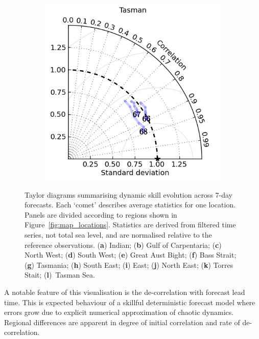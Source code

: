 \begin{figure}[H]
\begin{subfigure}{0.30\textwidth}
        \caption{}
    \end{subfigure}
    \begin{subfigure}{0.30\textwidth}
        \includegraphics[width=\textwidth]{figures/plots/taylor_diag_res_Tasman.png}
        \caption{}
    \end{subfigure}
    \caption{ Taylor diagrams summarising dynamic skill evolution across 7-day forecasts.
    Each `comet' describes average statistics for one location.
    Panels are divided according to regions shown in Figure~\ref{fig:map_locations}.
    Statistics are derived from filtered time series, not total sea level, and are normalised relative to the reference observations. (\textbf{a}) Indian; (\textbf{b}) Gulf of Carpentaria; (\textbf{c}) North West; (\textbf{d}) South West; (\textbf{e}) Great Aust Bight; (\textbf{f}) Bass Strait; (\textbf{g}) Tasmania; (\textbf{h}) South East; (\textbf{i}) East; (\textbf{j}) North East; (\textbf{k}) Torres Stait; (\textbf{l})~Tasman Sea. }\vspace{-12pt}
    \label{fig:taylors}
\end{figure}   
A notable feature of this visualisation is the de-correlation with forecast lead time.   
This is expected behaviour of a skillful deterministic forecast model where errors grow due to explicit numerical approximation of chaotic dynamics. 
Regional differences are apparent in degree of initial correlation and rate of de-correlation.


